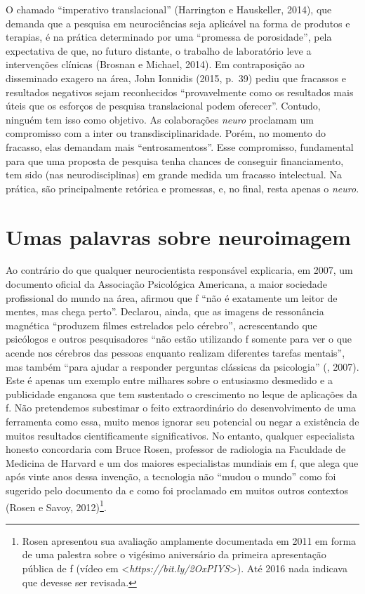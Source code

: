 O chamado ``imperativo translacional'' (Harrington e Hauskeller, 2014),
que demanda que a pesquisa em neurociências seja aplicável na forma de
produtos e terapias, é na prática determinado por uma ``promessa de
porosidade'', pela expectativa de que, no futuro distante, o trabalho de
laboratório leve a intervenções clínicas (Brosnan e Michael, 2014). Em
contraposição ao disseminado exagero na área, John Ionnidis (2015, p.~39)
pediu que fracassos e resultados negativos sejam reconhecidos
``provavelmente como os resultados mais úteis que os esforços de
pesquisa translacional podem oferecer''. Contudo, ninguém tem isso como
objetivo. As colaborações \emph{neuro} proclamam um compromisso com a
inter ou transdisciplinaridade. Porém, no momento do fracasso, elas
demandam mais ``entrosamentoss''. Esse compromisso, fundamental para que
uma proposta de pesquisa tenha chances de conseguir financiamento, tem
sido (nas neurodisciplinas) em grande medida um fracasso intelectual. Na
prática, são principalmente retórica e promessas, e, no final, resta
apenas o \emph{neuro}.

\chapter{Umas palavras sobre neuroimagem}

Ao contrário do que qualquer neurocientista responsável explicaria, em
2007, um documento oficial da Associação Psicológica Americana, a maior
sociedade profissional do mundo na área, afirmou que f ``não é
exatamente um leitor de mentes, mas chega perto''. Declarou, ainda, que
as imagens de ressonância magnética ``produzem filmes estrelados pelo
cérebro'', acrescentando que psicólogos e outros pesquisadores ``não
estão utilizando f somente para ver o que acende nos cérebros das
pessoas enquanto realizam diferentes tarefas mentais'', mas também
``para ajudar a responder perguntas clássicas da psicologia'' (,
2007). Este é apenas um exemplo entre milhares sobre o entusiasmo
desmedido e a publicidade enganosa que tem sustentado o crescimento no
leque de aplicações da f. Não pretendemos subestimar o feito
extraordinário do desenvolvimento de uma ferramenta como essa, muito
menos ignorar seu potencial ou negar a existência de muitos resultados
cientificamente significativos. No entanto, qualquer especialista
honesto concordaria com Bruce Rosen, professor de radiologia na
Faculdade de Medicina de Harvard e um dos maiores especialistas mundiais
em f, que alega que após vinte anos dessa invenção, a tecnologia não
``mudou o mundo'' como foi sugerido pelo documento da  e como foi
proclamado em muitos outros contextos (Rosen e Savoy,
2012)\footnote[8]{Rosen apresentou sua avaliação amplamente documentada em 2011 em
forma de uma palestra sobre o vigésimo aniversário da primeira
apresentação pública de f (vídeo em \textless{}\emph{https://bit.ly/2OxPIYS}\textgreater{}). Até 2016 nada indicava que
devesse ser revisada.}.


